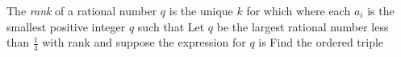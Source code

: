 The \textit{rank} of a rational number $q$ is the unique $k$ for which  where each $a_i$ is the smallest positive integer $q$ such that   Let $q$ be the largest rational number less than $\frac{1}{4}$ with rank  and suppose the expression for $q$ is   Find the ordered triple 